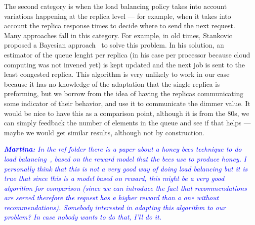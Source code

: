 The second category is when the load balancing policy takes into
account variations happening at the replica level --- for example,
when it takes into account the replica response times to decide where
to send the next request. Many approaches fall in this category. For
example, in old times, Stankovic proposed a Bayesian
approach~\cite{Stankovic:TC} to solve this problem. In his solution,
an estimator of the queue lenght per replica (in his case per
processor because cloud computing was not invened yet) is kept updated
and the next job is sent to the least congested replica. This
algorithm is very unlikely to work in our case because it has no
knowledge of the adaptation that the single replica is preforming, but
we borrow from the idea of having the replicas communicating some
indicator of their behavior, and use it to communicate the dimmer
value. It would be nice to have this as a comparison point, although
it is from the 80s, we can simply feedback the number of elements in
the queue and see if that helps --- maybe we would get similar
results, although not by construction.

\textcolor{blue}{\textit{\textbf{Martina:} In the ref folder there is
    a paper about a honey bees technique to do load
    balancing~\cite{BeesBased:ADAPTIVE}, based on the reward model
    that the bees use to produce honey. I personally think that this
    is not a very good way of doing load balancing but it is true that
    since this is a model based on reward, this might be a very good
    algorithm for comparison (since we can introduce the fact that
    recommendations are served therefore the request has a higher
    reward than a one without recommendations). Somebody interested in
    adapting this algorithm to our problem? In case nobody wants to do
    that, I'll do it.}}

